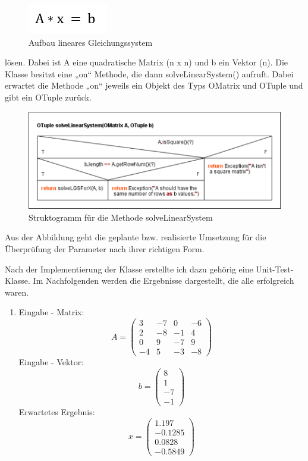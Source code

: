 \begin{figure}[h]
	\includegraphics[scale=1]{img/gleichungssystem-loesen}
	\caption[Aufbau lineares Gleichungssystem]{Aufbau lineares Gleichungssystem\footnotemark}
\end{figure}

lösen. Dabei ist A eine quadratische Matrix (n x n) und b ein Vektor (n).
Die Klasse besitzt eine „on“ Methode, die dann solveLinearSystem() aufruft. Dabei erwartet die Methode „on“ jeweils ein Objekt des Typs OMatrix und OTuple und gibt ein OTuple zurück. 

\begin{figure}[h]
	\includegraphics[width=\columnwidth]{img/solveLinearSystem}
	\caption[Struktogramm für die Methode solveLinearSystem]{Struktogramm für die Methode solveLinearSystem\footnotemark}
\end{figure}

Aus der Abbildung geht die geplante bzw. realisierte Umsetzung für die Überprüfung der Parameter nach ihrer richtigen Form. 

Nach der Implementierung der Klasse erstellte ich dazu gehörig eine Unit-Test-Klasse. Im Nachfolgenden werden die Ergebnisse dargestellt, die alle erfolgreich waren. 
\begin{enumerate}
	\item Eingabe - Matrix: $$ A= \left(\begin{matrix}3&-7&0&-6\\2&-8&-1&4\\0&9&-7&9\\-4&5&-3&-8\end{matrix}\right) $$
  Eingabe - Vektor: $$ b= \left(\begin{matrix} 8\\1\\-7\\-1\end{matrix}\right) $$ Erwartetes Ergebnis: $$ x= \left(\begin{matrix} 1.197\\-0.1285\\0.0828\\-0.5849\end{matrix}\right) $$
	
\end{enumerate}


